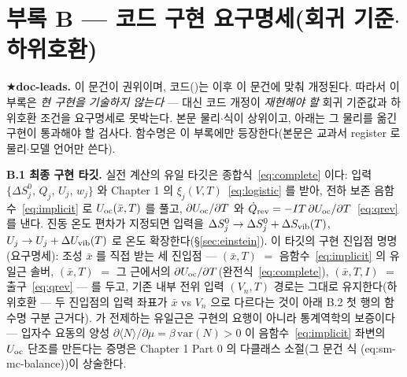 \section*{부록 B --- 코드 구현 요구명세(회귀 기준$\cdot$하위호환)}

★\textbf{doc-leads.} 이 문건이 권위이며, 코드()는 이후 이 문건에 맞춰 개정된다. 따라서 이
부록은 \emph{현 구현을 기술하지 않는다} --- 대신 코드 개정이 \emph{재현해야 할} 회귀 기준값과 하위호환 조건을
요구명세로 못박는다. 본문 물리$\cdot$식이 상위이고, 아래는 그 물리를 옮긴 구현이 통과해야 할 검사다. 함수명은
이 부록에만 등장한다(본문은 교과서 register 로 물리$\cdot$모델 언어만 쓴다).

\textbf{B.1 최종 구현 타깃.} 실전 계산의 유일 타깃은 종합식~\eqref{eq:complete} 이다: 입력
$\{\Delta S^0_j,\,Q_j,\,U_j,\,w_j\}$ 와 Chapter 1 의 $\xi_j(V,T)$~\eqref{eq:logistic} 를 받아, 전하 보존
음함수~\eqref{eq:implicit} 로 $U_{\mathrm{oc}}(\bar x,T)$ 를 풀고, $\partial U_{\mathrm{oc}}/\partial T$ 와 $\dot Q_{\mathrm{rev}}=-IT\,\partial
U_{\mathrm{oc}}/\partial T$~\eqref{eq:qrev} 를 낸다. 진동 온도 편차가 지정되면 입력을 $\Delta S^0_j\to\Delta
S^0_j+\Delta S_{\mathrm{vib}}(T)$, $U_j\to U_j+\Delta U_{\mathrm{vib}}(T)$ 로 온도 확장한다(\S\ref{sec:einstein}).
이 타깃의 구현 진입점 명명(요구명세): 조성 $\bar x$ 를 직접 받는 세 진입점 ---
$(\bar x,T)$ $=$ 음함수~\eqref{eq:implicit} 의 유일근 솔버,
$(\bar x,T)$ $=$ 그 근에서의 $\partial U_{\mathrm{oc}}/\partial T$(완전식~\eqref{eq:complete}),
$(\bar x,T,I)$ $=$ 출구~\eqref{eq:qrev} --- 를 두고, 기존 내부 전위 입력
$(V_n,T)$ 경로는 그대로 유지한다(하위호환 --- 두 진입점의 입력 좌표가
$\bar x$ vs $V_n$ 으로 다르다는 것이 아래 B.2 첫 행의 함수명 구분 근거다).  가 전제하는
유일근은 구현의 요행이 아니라 통계역학의 보증이다 --- 입자수 요동의 양성
$\partial\langle N\rangle/\partial\mu=\beta\,\mathrm{var}(N)>0$ 이 음함수~\eqref{eq:implicit} 좌변의 $U_{\mathrm{oc}}$
단조를 만든다는 증명은 Chapter 1 Part 0 의 다클래스 소절(그 문건 식 (eq:sm-mc-balance))이 상술한다.

